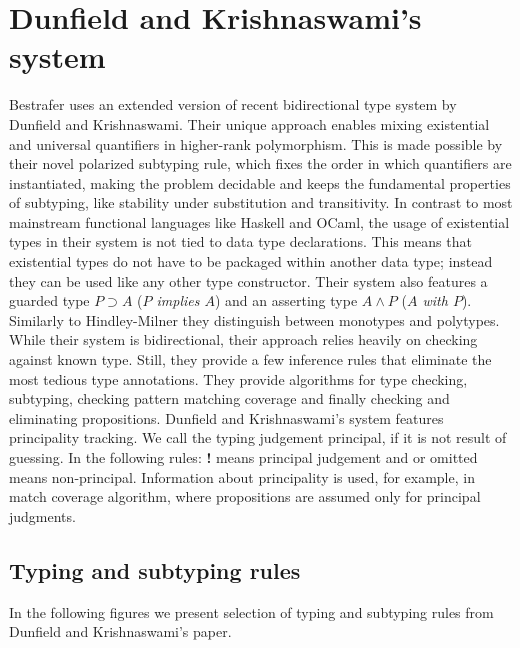 \documentclass[declaration,shortabstract,english]{iithesis}
\begin{document}
\section{Dunfield and Krishnaswami's system}
Bestrafer uses an extended version of recent bidirectional type system by Dunfield and Krishnaswami\cite{gadt-popl19}.
Their unique approach enables mixing existential and universal quantifiers in higher-rank polymorphism. This is made possible by
their novel polarized subtyping rule, which fixes the order in which quantifiers are instantiated, making the
problem decidable and keeps the fundamental properties of subtyping, like stability under substitution and transitivity.
In contrast to most mainstream functional languages like Haskell and OCaml,
the usage of existential types in their system is not tied to data type declarations. This means that existential types
do not have to be packaged within another data type; instead they can be used like any other type constructor.
Their system also features a guarded type $P \supset A $ (\textit{$P$ implies $A$})
and an asserting type $A \wedge  P$ (\textit{$A$ with $P$}).
Similarly to Hindley-Milner they distinguish between monotypes and polytypes.
While their system is bidirectional, their approach relies heavily on checking against known type. Still, they provide a few inference
rules that eliminate the most tedious type annotations.
They provide algorithms for type checking, subtyping, checking pattern matching coverage and finally checking and eliminating propositions.
Dunfield and Krishnaswami's system features principality tracking. We call the typing judgement principal, if it is not result of guessing.
In the following rules: \textbf{!} means principal judgement and \cancel{\textbf{!}} or omitted means non-principal.
Information about principality is used, for example, in match coverage algorithm, where propositions are assumed only
for principal judgments.
\subsection*{Typing and subtyping rules}
In the following figures we present selection of typing and subtyping rules from Dunfield and Krishnaswami's paper.
\end{document}
